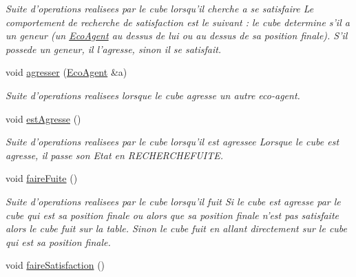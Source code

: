 \begin{CompactItemize}
\begin{CompactList}\small\item\em Suite d'operations realisees par le cube lorsqu'il cherche a se satisfaire Le comportement de recherche de satisfaction est le suivant : le cube determine s'il a un geneur (un \hyperlink{classEcoAgent}{EcoAgent} au dessus de lui ou au dessus de sa position finale). S'il possede un geneur, il l'agresse, sinon il se satisfait. \item\end{CompactList}\item 
void \hyperlink{classCube_85556598281efcfa925dd4ef4c8acba5}{agresser} (\hyperlink{classEcoAgent}{EcoAgent} \&a)
\begin{CompactList}\small\item\em Suite d'operations realisees lorsque le cube agresse un autre eco-agent. \item\end{CompactList}\item 
\hypertarget{classCube_a9af44bff02fb06ac5be83f4c041fe57}{
void \hyperlink{classCube_a9af44bff02fb06ac5be83f4c041fe57}{estAgresse} ()}
\label{classCube_a9af44bff02fb06ac5be83f4c041fe57}

\begin{CompactList}\small\item\em Suite d'operations realisees par le cube lorsqu'il est agressee Lorsque le cube est agresse, il passe son Etat en RECHERCHEFUITE. \item\end{CompactList}\item 
\hypertarget{classCube_ce1011f5a33ce211d5ca44e029f59224}{
void \hyperlink{classCube_ce1011f5a33ce211d5ca44e029f59224}{faireFuite} ()}
\label{classCube_ce1011f5a33ce211d5ca44e029f59224}

\begin{CompactList}\small\item\em Suite d'operations realisees par le cube lorsqu'il fuit Si le cube est agresse par le cube qui est sa position finale ou alors que sa position finale n'est pas satisfaite alors le cube fuit sur la table. Sinon le cube fuit en allant directement sur le cube qui est sa position finale. \item\end{CompactList}\item 
\hypertarget{classCube_1fec2199edab8e6cfdb3685256d2cdec}{
void \hyperlink{classCube_1fec2199edab8e6cfdb3685256d2cdec}{faireSatisfaction} ()}
\label{classCube_1fec2199edab8e6cfdb3685256d2cdec}


\end{CompactItemize}
